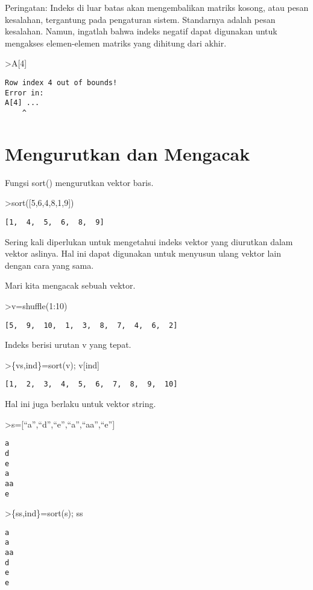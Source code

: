 \documentclass[
]{book}
\begin{document}
Peringatan: Indeks di luar batas akan mengembalikan matriks kosong, atau pesan kesalahan, tergantung pada pengaturan sistem. Standarnya adalah pesan kesalahan. Namun, ingatlah bahwa indeks negatif dapat digunakan untuk mengakses elemen-elemen matriks yang dihitung dari akhir.

\textgreater A{[}4{]}

\begin{verbatim}
Row index 4 out of bounds!
Error in:
A[4] ...
    ^
\end{verbatim}

\chapter{Mengurutkan dan Mengacak}\label{mengurutkan-dan-mengacak}

Fungsi sort() mengurutkan vektor baris.

\textgreater sort({[}5,6,4,8,1,9{]})

\begin{verbatim}
[1,  4,  5,  6,  8,  9]
\end{verbatim}

Sering kali diperlukan untuk mengetahui indeks vektor yang diurutkan dalam vektor aslinya. Hal ini dapat digunakan untuk menyusun ulang vektor lain dengan cara yang sama.

Mari kita mengacak sebuah vektor.

\textgreater v=shuffle(1:10)

\begin{verbatim}
[5,  9,  10,  1,  3,  8,  7,  4,  6,  2]
\end{verbatim}

Indeks berisi urutan v yang tepat.

\textgreater\{vs,ind\}=sort(v); v{[}ind{]}

\begin{verbatim}
[1,  2,  3,  4,  5,  6,  7,  8,  9,  10]
\end{verbatim}

Hal ini juga berlaku untuk vektor string.

\textgreater s={[}``a'',``d'',``e'',``a'',``aa'',``e''{]}

\begin{verbatim}
a
d
e
a
aa
e
\end{verbatim}

\textgreater\{ss,ind\}=sort(s); ss

\begin{verbatim}
a
a
aa
d
e
e
\end{verbatim}
\end{document}
